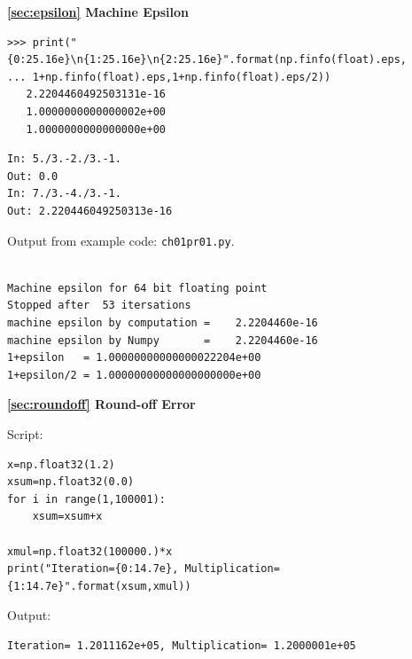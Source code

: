 \bigskip
\textbf{\ref{sec:epsilon} Machine Epsilon}

\begin{example}

\small
\begin{mybox}
	\begin{verbatim}
>>> print("{0:25.16e}\n{1:25.16e}\n{2:25.16e}".format(np.finfo(float).eps,
... 1+np.finfo(float).eps,1+np.finfo(float).eps/2))
   2.2204460492503131e-16
   1.0000000000000002e+00
   1.0000000000000000e+00
   \end{verbatim}
\end{mybox}
\normalsize
\end{example}

\noindent
\begin{example}
	
\small
\begin{mybox}
	\begin{verbatim}
In: 5./3.-2./3.-1.
Out: 0.0
In: 7./3.-4./3.-1.
Out: 2.220446049250313e-16
   \end{verbatim}
\end{mybox}
\normalsize
\end{example}

\noindent
\begin{example}

Output from example code: \texttt{ch01pr01.py}.

\small
\begin{mybox}
	\begin{verbatim}

Machine epsilon for 64 bit floating point
Stopped after  53 itersations
machine epsilon by computation =    2.2204460e-16
machine epsilon by Numpy       =    2.2204460e-16
1+epsilon   = 1.00000000000000022204e+00
1+epsilon/2 = 1.00000000000000000000e+00
   \end{verbatim}
\end{mybox}
\normalsize
\end{example}


\textbf{\ref{sec:roundoff} Round-off Error}

\begin{example}

\small
\begin{mybox}
Script:
\begin{verbatim}
x=np.float32(1.2)
xsum=np.float32(0.0)
for i in range(1,100001):
	xsum=xsum+x

xmul=np.float32(100000.)*x
print("Iteration={0:14.7e}, Multiplication={1:14.7e}".format(xsum,xmul))
\end{verbatim}

\medskip
Output:
\begin{verbatim}
Iteration= 1.2011162e+05, Multiplication= 1.2000001e+05
\end{verbatim}
\end{mybox}
\normalsize
\end{example}

